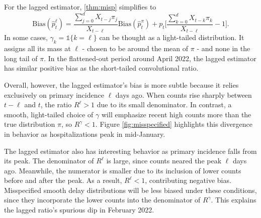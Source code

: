 \documentclass{article}
\begin{document}

For the lagged estimator, \ref{thm:misp} simplifies to
\begin{equation}\label{eq:LagBias}
         \text{Bias}(\hat{p}_t^\ell) = \frac{\sum_{j=0}^d X_{t-j}\pi_j}{X_{t-\ell}}\text{Bias}(\hat{p}_t^\pi) + p_t\big[ \frac{\sum_{k=0}^d X_{t-k}\pi_k}{X_{t-\ell}}-1\big].
\end{equation}
In some cases,  $\gamma_k=\mathds{1}\{k=\ell\}$ can be thought as a light-tailed distribution. It assigns all its mass at $\ell$ - chosen to be around the mean of $\pi$ - and none in the long tail of $\pi$. In the flattened-out period around April 2022, the lagged estimator has similar positive bias as the short-tailed convolutional ratio. 

Overall, however, the lagged estimator's bias is more subtle because it relies exclusively on primary incidence $\ell$ days ago. When counts rise sharply between $t-\ell$ and $t$, the ratio $R^\ell>1$ due to its small denominator. In contrast, a smooth, light-tailed choice of $\gamma$ will emphasize recent high counts more than the true distribution $\pi$, so $R^\gamma < 1$. Figure \ref{fig:misspecified} highlights this divergence in behavior as hospitalizations peak in mid-January. 

The lagged estimator also has interesting behavior as primary incidence falls from its peak. The denominator of $R^\ell$ is large, since counts neared the peak $\ell$ days ago. Meanwhile, the numerator is smaller due to its inclusion of lower counts before and after the peak. As a result, $R^\ell<1$, contributing negative bias. Misspecified smooth delay distributions will be less biased under these conditions, since they incorporate the lower counts into the denominator of $R^\gamma$. This explains the lagged ratio's spurious dip in February 2022. 


\end{document}
